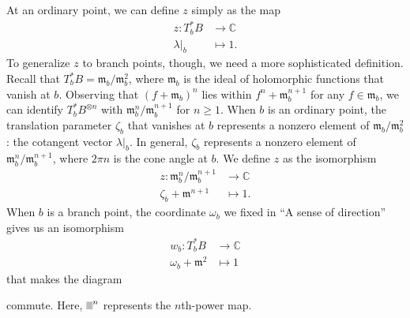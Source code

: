 \documentclass{article}
\newcommand{\maps}{\colon}
\newcommand{\C}{\mathbb{C}}
\newcommand{\blankbox}{{\fboxsep 0pt \colorbox{lightgray}{\phantom{$h$}}}}
\newcommand{\van}{\mathfrak{m}}
\theoremstyle{definition}
\theoremstyle{plain}
\begin{document}
At an ordinary point, we can define $z$ simply as the map
\begin{align*}
z \maps T^*_bB & \to \C \\
\lambda\big|_b & \mapsto 1.
\end{align*}
To generalize $z$ to branch points, though, we need a more sophisticated definition. Recall that $T^*_bB = \van_b / \van_b^2$, where $\van_b$ is the ideal of holomorphic functions that vanish at $b$. Observing that $(f + \van_b)^n$ lies within $f^n + \van_b^{n+1}$ for any $f \in \van_b$, we can identify $T^*_bB^{\otimes n}$ with $\van_b^n / \van_b^{n+1}$ for $n \ge 1$. When $b$ is an ordinary point, the translation parameter $\zeta_b$ that vanishes at $b$ represents a nonzero element of $\van_b / \van_b^2$: the cotangent vector $\lambda\big|_b$. In general, $\zeta_b$ represents a nonzero element of $\van_b^n / \van_b^{n+1}$, where $2\pi n$ is the cone angle at $b$. We define $z$ as the isomorphism
\begin{align*}
z \maps \van_b^n / \van_b^{n+1} & \to \C \\
\zeta_b + \van^{n+1} & \mapsto 1.
\end{align*}
When $b$ is a branch point, the coordinate $\omega_b$ we fixed in ``A sense of direction'' gives us an isomorphism
\begin{align*}
w_b \maps T^*_bB & \to \C \\
\omega_b + \van^2 & \mapsto 1
\end{align*}
that makes the diagram
\begin{center}
\end{center}
commute. Here, $\blankbox^n$ represents the $n$th-power map.
\end{document}
